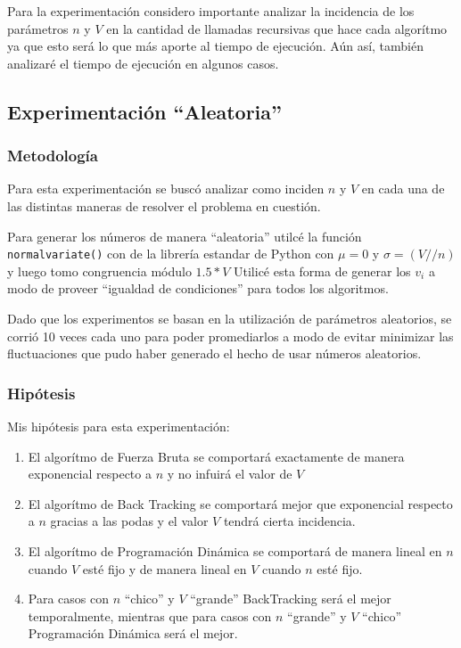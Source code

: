 Para la experimentaci\'on considero importante analizar la incidencia de los par\'ametros
$n$ y $V$ en la cantidad de llamadas recursivas que hace cada algor\'itmo ya que esto ser\'a lo que m\'as
aporte al tiempo de ejecuci\'on. A\'un as\'i, tambi\'en analizar\'e el tiempo de ejecuci\'on en algunos casos.

\subsection{Experimentaci\'on ``Aleatoria''}
\subsubsection{Metodolog\'ia}
\par Para esta experimentaci\'on se busc\'o analizar como inciden $n$ y $V$ en cada una
de las distintas maneras de resolver el problema en cuesti\'on. 
\par Para generar los n\'umeros de manera ``aleatoria'' utilc\'e la funci\'on \texttt{normalvariate()} con 
de la librer\'ia estandar de Python con $\mu = 0 $ y $\sigma = (V // n)$ y luego tomo congruencia m\'odulo $1.5*V$
Utilic\'e esta forma de generar los $v_i$ a modo de proveer ``igualdad de condiciones'' para todos los algoritmos.
\par Dado que los experimentos se basan en la utilizaci\'on de par\'ametros aleatorios, se corri\'o 10 veces cada
uno para poder promediarlos a modo de evitar minimizar las fluctuaciones que pudo haber generado el hecho de usar
n\'umeros aleatorios.

\subsubsection{Hip\'otesis}
Mis hip\'otesis para esta experimentaci\'on:
\begin{enumerate}[I]
    \item El algor\'itmo de Fuerza Bruta se comportar\'a exactamente de manera exponencial respecto a $n$ y no 
    infuir\'a el valor de $V$
    \item El algor\'itmo de Back Tracking se comportar\'a mejor que exponencial respecto a $n$ gracias a las podas
    y el valor $V$ tendr\'a cierta incidencia.
    \item El algor\'itmo de Programaci\'on Din\'amica se comportar\'a de manera lineal en $n$ cuando $V$ est\'e fijo
    y de manera lineal en $V$ cuando $n$ est\'e fijo.
    \item Para casos con $n$ ``chico'' y $V$ ``grande'' BackTracking ser\'a el mejor temporalmente, mientras que para 
    casos con $n$ ``grande'' y $V$ ``chico'' Programaci\'on Din\'amica ser\'a el mejor.
\end{enumerate}


